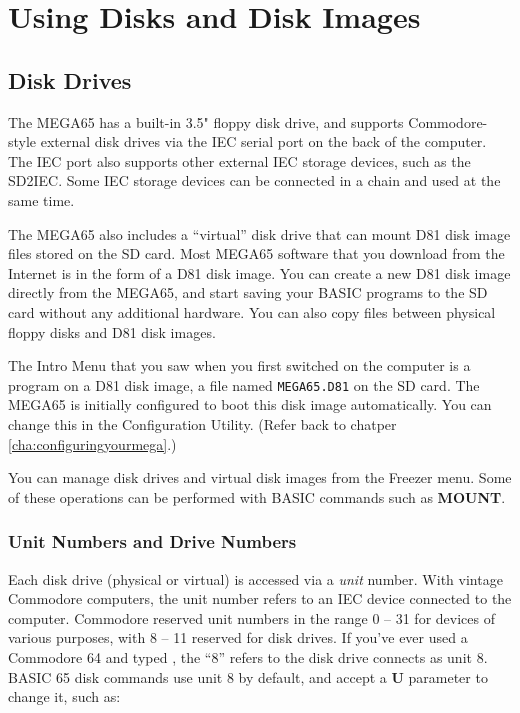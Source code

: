 \chapter{Using Disks and Disk Images}
\label{cha:using-disks}


\section{Disk Drives}

The MEGA65 has a built-in 3.5" floppy disk drive, and supports Commodore-style external disk drives via the IEC serial port on the back of the computer. The IEC port also supports other external IEC storage devices, such as the SD2IEC. Some IEC storage devices can be connected in a chain and used at the same time.

The MEGA65 also includes a ``virtual'' disk drive that can mount D81 disk image files stored on the SD card. Most MEGA65 software that you download from the Internet is in the form of a D81 disk image. You can create a new D81 disk image directly from the MEGA65, and start saving your BASIC programs to the SD card without any additional hardware. You can also copy files between physical floppy disks and D81 disk images.

The Intro Menu that you saw when you first switched on the computer is a program on a D81 disk image, a file named {\tt MEGA65.D81} on the SD card. The MEGA65 is initially configured to boot this disk image automatically. You can change this in the Configuration Utility. (Refer back to chatper \vref{cha:configuringyourmega}.)

You can manage disk drives and virtual disk images from the Freezer menu. Some of these operations can be performed with BASIC commands such as {\bf MOUNT}.

\subsection{Unit Numbers and Drive Numbers}

Each disk drive (physical or virtual) is accessed via a {\it unit} number. With vintage Commodore computers, the unit number refers to an IEC device connected to the computer. Commodore reserved unit numbers in the range 0 -- 31 for devices of various purposes, with 8 -- 11 reserved for disk drives. If you've ever used a Commodore 64 and typed , the ``8'' refers to the disk drive connects as unit 8. BASIC 65 disk commands use unit 8 by default, and accept a {\bf U} parameter to change it, such as: 

